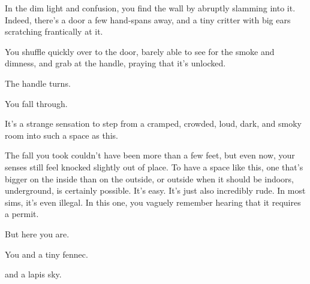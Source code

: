 In the dim light and confusion, you find the wall by abruptly slamming into it. Indeed, there's a door a few hand-spans away, and a tiny critter with big ears scratching frantically at it.

You shuffle quickly over to the door, barely able to see for the smoke and dimness, and grab at the handle, praying that it's unlocked.

\vfill

\newpage

\null
\vfill

The handle turns.

\vfill
\newpage

\null
\vfill

You fall through.

\vfill

\newpage

\null
\vfill

It's a strange sensation to step from a cramped, crowded, loud, dark, and smoky room into such a space as this.

The fall you took couldn't have been more than a few feet, but even now, your senses still feel knocked slightly out of place. To have a space like this, one that's bigger on the inside than on the outside, or outside when it should be indoors, underground, is certainly possible. It's easy. It's just also incredibly rude. In most sims, it's even illegal. In this one, you vaguely remember hearing that it requires a permit.

But here you are.

\vfill

\newpage
\null
\vfill

You and a tiny fennec.

\phantom{You} {\footnotesize and a lapis sky.}

\phantom{You and}{\tiny endless green fields.}

\vfill

\begin{comment}
\null
\vfill

You and a tiny fennec.

\null
\vfill

\newpage

\null
\vfill

You and a lapis sky.

\null
\vfill

\newpage

\null
\vfill

You and endless green fields.

\null
\vfill
\end{comment}

